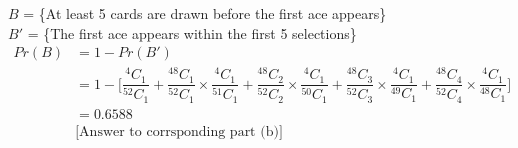 \documentclass{article}
\begin{document}
\begin{enumerate}
\begin{enumerate}
			$B$ = \{At least 5 cards are drawn before the first ace appears\}\\
			$B'$ = \{The first ace appears within the first 5 selections\}
			\begin{align*}
				Pr(B) &= 1 - Pr(B')\\
					  &= 1 - \Big[\dfrac{^{4}C_{1}}{^{52}C_{1}} + \dfrac{^{48}C_{1}}{^{52}C_{1}} \times \dfrac{^{4}C_{1}}{^{51}C_{1}}+ \dfrac{^{48}C_{2}}{^{52}C_{2}} \times \dfrac{^{4}C_{1}}{^{50}C_{1}} + \dfrac{^{48}C_{3}}{^{52}C_{3}} \times \dfrac{^{4}C_{1}}{^{49}C_{1}} + \dfrac{^{48}C_{4}}{^{52}C_{4}} \times \dfrac{^{4}C_{1}}{^{48}C_{1}}\Big]\\
					  &= \mathbf{0.6588}\\ & \text{[Answer to corrsponding part (b)]}
			\end{align*}
			
		\end{enumerate}
		
	\end{enumerate}
	
\end{document}
